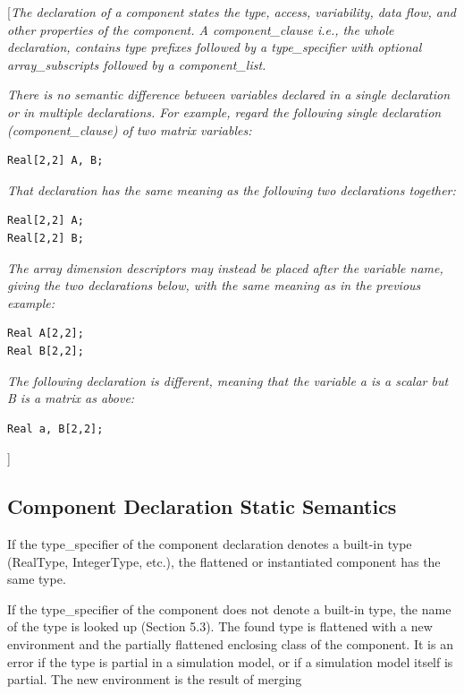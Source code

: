 \documentclass[10pt,a4paper]{report}
\def\Mcommentbegin#1{{[}\emph{#1}}
\def\Mcommentend#1{\emph{#1}{]}}
\def\Mcommentmid#1{\emph{#1}}
\begin{document}
\Mcommentbegin{The declaration of a component states the type, access,
variability, data flow, and other properties of the component. A
\emph{component\_clause} i.e., the whole declaration, contains
type prefixes followed by a \emph{type\_specifier} with optional
\emph{array\_subscripts} followed by a \emph{component\_list.}}

\Mcommentmid{There is no semantic difference between variables declared in a
single declaration or in multiple declarations. For example, regard the
following single declaration (\emph{component\_clause}) of two matrix
variables:}
\begin{lstlisting}[language=modelica]
Real[2,2] A, B;
\end{lstlisting}

\Mcommentmid{That declaration has the same meaning as the following two
declarations together:}
\begin{lstlisting}[language=modelica]
Real[2,2] A;
Real[2,2] B;
\end{lstlisting}

\Mcommentmid{The array dimension descriptors may instead be placed after the
variable name, giving the two declarations below, with the same meaning
as in the previous example:}
\begin{lstlisting}[language=modelica]
Real A[2,2];
Real B[2,2];
\end{lstlisting}
\Mcommentmid{The following declaration is different, meaning that the variable
a is a scalar but B is a matrix as above:}
\begin{lstlisting}[language=modelica]
Real a, B[2,2];
\end{lstlisting}
\Mcommentend{}

\subsection{Component Declaration Static Semantics}

If the type\_specifier of the component declaration denotes a built-in
type (RealType, IntegerType, etc.), the flattened or instantiated
component has the same type.

If the type\_specifier of the component does not denote a built-in type,
the name of the type is looked up (Section 5.3). The found type is
flattened with a new environment and the partially flattened enclosing
class of the component. It is an error if the type is partial in a
simulation model, or if a simulation model itself is partial. The new
environment is the result of merging
\end{document}
